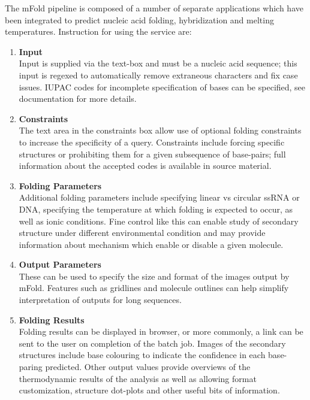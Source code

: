     The mFold pipeline is composed of a number of separate applications which have been integrated to predict nucleic acid folding, hybridization and melting temperatures.\autocite{B19} Instruction for using the service are:
    \begin{enumerate}
        \item \textbf{Input} \\
        Input is supplied via the text-box and must be a nucleic acid sequence; this input is regexed to automatically remove extraneous characters and fix case issues.\autocite{B19} IUPAC codes for incomplete specification of bases can be specified, see documentation for more details.\autocite{B19}

        \item \textbf{Constraints} \\
        The text area in the constraints box allow use of optional folding constraints to increase the specificity of a query.\autocite{B19} Constraints include forcing specific structures or prohibiting them for a given subsequence of base-pairs; full information about the accepted codes is available in source material.\autocite{B19}

        \item \textbf{Folding Parameters} \\
        Additional folding parameters include specifying linear vs circular ssRNA or DNA, specifying the temperature at which folding is expected to occur, as well as ionic conditions.\autocite{B19} Fine control like this can enable study of secondary structure under different environmental condition and may provide information about mechanism which enable or disable a given molecule.

        \item \textbf{Output Parameters} \\
        These can be used to specify the size and format of the images output by mFold.\autocite{B19} Features such as gridlines and molecule outlines can help simplify interpretation of outputs for long sequences.\autocite{B19}

        \item \textbf{Folding Results} \\
        Folding results can be displayed in browser, or more commonly, a link can be sent to the user on completion of the batch job.\autocite{B19} Images of the secondary structures include base colouring to indicate the confidence in each base-paring predicted.\autocite{B19} Other output values provide overviews of the thermodynamic results of the analysis as well as allowing format customization, structure dot-plots and other useful bits of information.\autocite{B19}
    

    \end{enumerate}
    
